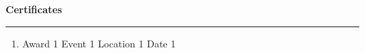 

\textbf{Certificates}

\par\noindent\rule{\textwidth}{0.2pt}


\begin{enumerate}
    \item   {{Award 1} %
            {Event 1} %
            {Location 1} %
            {Date 1}} %
\end{enumerate}
